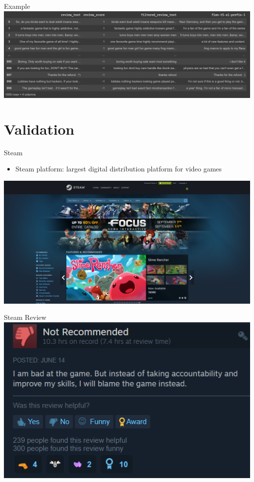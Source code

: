 \documentclass{beamer}
\begin{document}
\begin{frame}{Example}
\includegraphics[scale=0.35]
{img/ex_pre_trained_data.png}
\centering
\end{frame}


\section{Validation}

\begin{frame}{Steam}
\begin{itemize}
\item Steam platform: largest digital distribution platform for video games
\end{itemize}
\includegraphics[width = \textwidth]
{img/1.png}
\centering
\end{frame}

\begin{frame}{Steam Review}
\includegraphics[width = \textwidth]
{img/2.png}
\centering
\end{frame}
\end{document}
